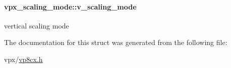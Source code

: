 \paragraph[{\texorpdfstring{v\+\_\+scaling\+\_\+mode}{v_scaling_mode}}]{ vpx\+\_\+scaling\+\_\+mode\+::v\+\_\+scaling\+\_\+mode}\hypertarget{structvpx__scaling__mode_a3a44f5213ead89e6e488d99bb5a81563}{}\label{structvpx__scaling__mode_a3a44f5213ead89e6e488d99bb5a81563}
vertical scaling mode 

The documentation for this struct was generated from the following file\+:\begin{DoxyCompactItemize}
\item 
vpx/\hyperlink{vp8cx_8h}{vp8cx.\+h}\end{DoxyCompactItemize}
